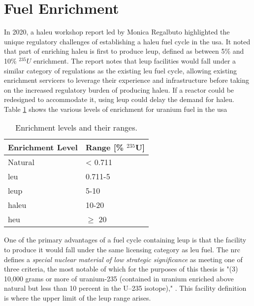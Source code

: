 \section{Fuel Enrichment}
\label{sec:leup}

In 2020, a \gls{haleu} workshop report led by Monica Regalbuto \cite{regalbuto_high_assay_2020} highlighted the unique regulatory challenges of establishing a \gls{haleu} fuel cycle in the \gls{usa}. It noted that part of enriching \gls{haleu} is first to produce \gls{leup}, defined as between 5\% and 10\% $^{235}U$ enrichment. The report notes that \gls{leup} facilities would fall under a similar category of regulations as the existing \gls{leu} fuel cycle, allowing existing enrichment servicers to leverage their experience and infrastructure before taking on the increased regulatory burden of producing \gls{haleu}. If a reactor could be redesigned to accommodate it, using \gls{leup} could delay the demand for \gls{haleu}. Table \ref{tab:enrichment_levels} shows the various levels of enrichment for uranium fuel in the \gls{usa}

\begin{table}[H]
   \centering
   \caption{Enrichment levels and their ranges.}
   \label{tab:enrichment_levels}
   \begin{tabular}{l l}
      \hline
      \textbf{Enrichment Level} & \textbf{Range [\%  $^{235}$U]} \\
      \hline
      Natural & < 0.711 \\
      \gls{leu} & 0.711-5 \\
      \gls{leup} & 5-10 \\
      \gls{haleu} & 10-20 \\
      \gls{heu} & $\geq$ 20  \\
      \hline
   \end{tabular}
\end{table}

One of the primary advantages of a fuel cycle containing \gls{leup} is that the facility to produce it would fall under the same licensing category as \gls{leu} fuel. The \gls{nrc} defines a \textit{special nuclear material of low strategic significance} as meeting one of three criteria, the most notable of which for the purposes of this thesis is "(3) 10,000 grams or more of uranium-235 (contained in uranium enriched above natural but less than 10 percent in the U–235 isotope)," \cite{nrc_catiii}. This facility definition is where the upper limit of the \gls{leup} range arises.

